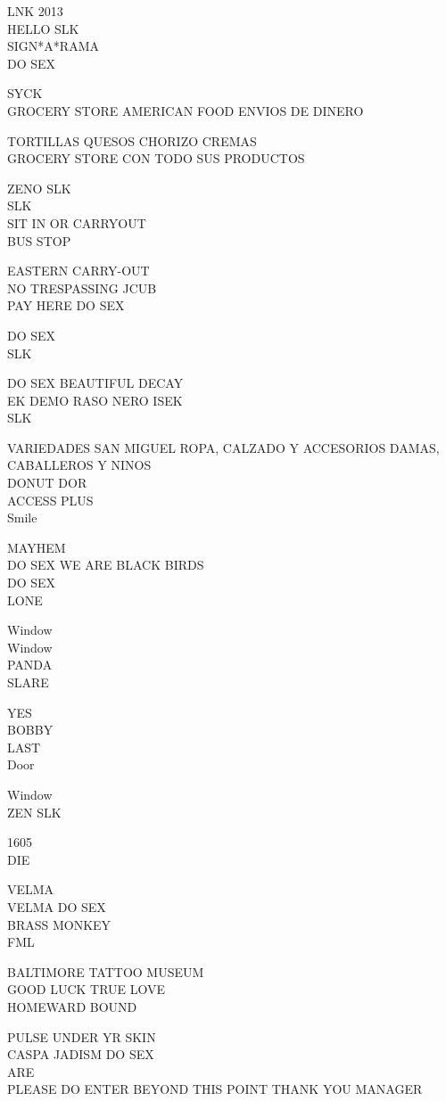 \documentclass[10pt,letterpaper]{article}
\begin{document}
LNK 2013\\
HELLO SLK\\
SIGN*A*RAMA\\
DO SEX

SYCK\\
GROCERY STORE AMERICAN FOOD ENVIOS DE DINERO

TORTILLAS QUESOS CHORIZO CREMAS\\
GROCERY STORE CON TODO SUS PRODUCTOS

ZENO SLK\\
SLK\\
SIT IN OR CARRYOUT\\
BUS STOP

EASTERN CARRY{-}OUT\\
NO TRESPASSING JCUB\\
PAY HERE DO SEX

DO SEX\\
SLK

DO SEX BEAUTIFUL DECAY\\
EK DEMO RASO NERO ISEK\\
SLK

VARIEDADES SAN MIGUEL ROPA, CALZADO Y ACCESORIOS DAMAS, CABALLEROS Y NINOS\\
DONUT DOR\\
ACCESS PLUS\\
Smile

MAYHEM\\
DO SEX WE ARE BLACK BIRDS\\
DO SEX\\
LONE

Window\\
Window\\
PANDA\\
SLARE

YES\\
BOBBY\\
LAST\\
Door

Window\\
ZEN SLK

1605\\
DIE

VELMA\\
VELMA DO SEX\\
BRASS MONKEY\\
FML

BALTIMORE TATTOO MUSEUM\\
GOOD LUCK TRUE LOVE\\
HOMEWARD BOUND

PULSE UNDER YR SKIN\\
CASPA JADISM DO SEX\\
ARE\\
PLEASE DO ENTER BEYOND THIS POINT THANK YOU MANAGER
\end{document}
